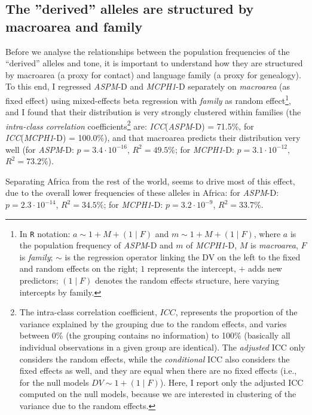 \documentclass[twoside,onecolumn]{article}
\begin{document}
\subsection{The ''derived'' alleles are structured by macroarea and family}

Before we analyse the relationships between the population frequencies of the ``derived'' alleles and tone, it is important to understand how they are structured by macroarea (a proxy for contact) and language family (a proxy for genealogy).
To this end, I regressed \textit{ASPM}-D and \textit{MCPH1}-D separately on \textit{macroarea} (as fixed effect) using mixed-effects beta regression with \textit{family} as random effect\footnote{\label{note_reg_R}In \texttt{R} notation: $a \sim 1 + M + (1 \mid F)$ and $m \sim 1 + M + (1 \mid F)$, where $a$ is the population frequency of \textit{ASPM}-D and $m$ of \textit{MCPH1}-D, $M$ is \textit{macroarea}, $F$ is \textit{family}; $\sim$ is the regression operator linking the DV on the left to the fixed and random effects on the right; $1$ represents the intercept, $+$ adds new predictors; $(1 \mid F)$ denotes the random effects structure, here varying intercepts by family.},
and I found that their distribution is very strongly clustered within families (the \emph{intra-class correlation} coefficients\footnote{The intra-class correlation coefficient, $ICC$, represents the proportion of the variance explained by the grouping due to the random effects, and varies between 0\% (the grouping contains no information) to 100\% (basically all individual observations in a given group are identical). The \emph{adjusted} ICC only considers the random effects, while the \emph{conditional} ICC also considers the fixed effects as well, and they are equal when there are no fixed effects (i.e., for the null models $DV \sim 1 + (1 \mid F)$). Here, I report only the adjusted ICC computed on the null models, because we are interested in clustering of the variance due to the random effects.} are: \textit{ICC}(\textit{ASPM}-D) = 71.5\%, for \textit{ICC}(\textit{MCPH1}-D) = 100.0\%),
and that macroarea predicts their distribution very well (for \textit{ASPM}-D: $p = 3.4\cdot10^{-16}$, $R^2 = 49.5\%$; for \textit{MCPH1}-D: $p = 3.1\cdot10^{-12}$, $R^2 = 73.2\%$).

Separating Africa from the rest of the world, seems to drive most of this effect, due to the overall lower frequencies of these alleles in Africa: for \textit{ASPM}-D: $p = 2.3\cdot10^{-14}$, $R^2 = 34.5\%$; for \textit{MCPH1}-D: $p = 3.2\cdot10^{-9}$, $R^2 = 33.7\%$.
\end{document}
